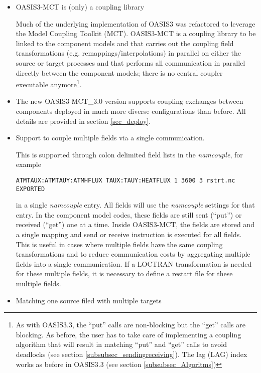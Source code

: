 \begin{itemize}

\item OASIS3-MCT is (only) a coupling library

Much of the underlying implementation of OASIS3 was refactored to
leverage the Model Coupling Toolkit (MCT). OASIS3-MCT is a coupling
library to be linked to the component models and that
carries out the coupling field transformations (e.g. remappings/interpolations)
in parallel on either the source or target processes and that performs
all communication in parallel directly between the component models; there
is no central coupler executable anymore\footnote{As with OASIS3.3,
  the ``put'' calls are non-blocking but the ``get'' calls are
blocking. As before, the user has to take care of implementing a coupling
algorithm that will result in matching ``put'' and ``get'' calls to
avoid deadlocks (see section \ref{subsubsec_sendingreceiving}). The lag (LAG) index works as
before in OASIS3.3 (see section \ref{subsubsec_Algoritms})}. 

\item The new OASIS3-MCT\_3.0 version supports coupling exchanges
  between components deployed in much more diverse configurations than
  before. All
  details are provided in section \ref{sec_deploy}.

\item Support to couple multiple fields via a single communication.

 This is supported through colon
delimited field lists in the {\it namcouple}, for example 

{\tt ATMTAUX:ATMTAUY:ATMHFLUX  TAUX:TAUY:HEATFLUX 1 3600 3 rstrt.nc EXPORTED}

 in a single {\it namcouple} entry. All fields will use the
{\it namcouple} settings for that entry. In the component model codes,
these fields are still sent (``put'') or received (``get'') one at a
time. Inside OASIS3-MCT, the fields are stored and a single mapping
and send or receive instruction is executed for all fields. This is
useful in cases where multiple fields have the same coupling
transformations and to reduce communication costs by aggregating multiple 
fields into a single communication. If a LOCTRAN transformation is needed
for these multiple fields, it is necessary to define a restart file for 
these multiple fields.

\item Matching one source filed with multiple targets


\end{itemize}
